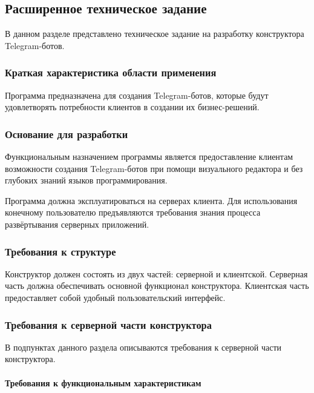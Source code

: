 

\subsection{Расширенное техническое задание}

В данном разделе представлено техническое задание на разработку
конструктора Telegram-ботов.

\subsubsection{Краткая характеристика области применения}

Программа предназначена для создания
Telegram-ботов, которые будут удовлетворять
потребности клиентов в создании их бизнес-решений.


\subsubsection{Основание для разработки}

Функциональным назначением программы является предоставление
клиентам возможности создания Telegram-ботов при помощи визуального редактора и
без глубоких знаний языков программирования.

Программа должна эксплуатироваться на серверах клиента.
Для использования конечному пользователю предъявляются требования знания процесса
развёртывания серверных приложений.


\subsubsection{Требования к структуре}

Конструктор должен состоять из двух частей: серверной и клиентской.
Серверная часть должна обеспечивать основной функционал конструктора.
Клиентская часть предоставляет собой удобный пользовательский интерфейс.

\subsubsection{Требования к серверной части конструктора}

В подпунктах данного раздела описываются требования к серверной части конструктора.

\paragraph{Требования к функциональным характеристикам}

